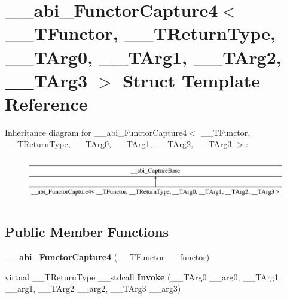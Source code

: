 \hypertarget{struct____abi___functor_capture4}{}\section{\+\_\+\+\_\+abi\+\_\+\+Functor\+Capture4$<$ \+\_\+\+\_\+\+T\+Functor, \+\_\+\+\_\+\+T\+Return\+Type, \+\_\+\+\_\+\+T\+Arg0, \+\_\+\+\_\+\+T\+Arg1, \+\_\+\+\_\+\+T\+Arg2, \+\_\+\+\_\+\+T\+Arg3 $>$ Struct Template Reference}
\label{struct____abi___functor_capture4}
Inheritance diagram for \+\_\+\+\_\+abi\+\_\+\+Functor\+Capture4$<$ \+\_\+\+\_\+\+T\+Functor, \+\_\+\+\_\+\+T\+Return\+Type, \+\_\+\+\_\+\+T\+Arg0, \+\_\+\+\_\+\+T\+Arg1, \+\_\+\+\_\+\+T\+Arg2, \+\_\+\+\_\+\+T\+Arg3 $>$\+:\begin{figure}[H]
\begin{center}
\leavevmode
\includegraphics[height=1.964912cm]{db/d60/struct____abi___functor_capture4}
\end{center}
\end{figure}
\subsection*{Public Member Functions}
\begin{DoxyCompactItemize}
\item 
\mbox{\label{struct____abi___functor_capture4_adf04d65aa52c812012dd712a06d58c89}} 
{\bfseries \+\_\+\+\_\+abi\+\_\+\+Functor\+Capture4} (\+\_\+\+\_\+\+T\+Functor \+\_\+\+\_\+functor)
\item 
\mbox{\label{struct____abi___functor_capture4_ad305c28257a67af33550d96920ab195c}} 
virtual \+\_\+\+\_\+\+T\+Return\+Type \+\_\+\+\_\+stdcall {\bfseries Invoke} (\+\_\+\+\_\+\+T\+Arg0 \+\_\+\+\_\+arg0, \+\_\+\+\_\+\+T\+Arg1 \+\_\+\+\_\+arg1, \+\_\+\+\_\+\+T\+Arg2 \+\_\+\+\_\+arg2, \+\_\+\+\_\+\+T\+Arg3 \+\_\+\+\_\+arg3)
\end{DoxyCompactItemize}
